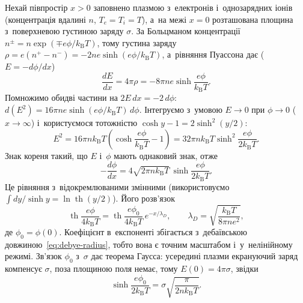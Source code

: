Нехай півпростір $x>0$ заповнено плазмою з~електронів і~однозарядних іонів (концентрація
вдалині $n$, $T_e=T_i=T$), а~на межі $x=0$ розташована площина з~поверхневою густиною
заряду $\sigma$. За Больцманом концентрації $n^{\pm}=n\exp(\mp e\phi/k_{\mathrm B}T)$,
тому густина заряду $\rho=e(n^+-n^-)=-2ne\sinh(e\phi/k_{\mathrm B}T)$, а~рівняння
Пуассона дає ($E=-d\phi/dx$)
\begin{equation*}
	\frac{dE}{dx}=4\pi\rho=-8\pi ne\sinh\frac{e\phi}{k_{\mathrm B}T}.
\end{equation*}
Помножимо обидві частини на $2E\,dx=-2\,d\phi$: $d(E^2)=16\pi
	ne\sinh(e\phi/k_{\mathrm B}T)\,d\phi$. Інтегруємо з~умовою $E\to0$ при $\phi\to0$
($x\to\infty$) і~користуємося тотожністю $\cosh y-1=2\sinh^2(y/2)$:
\begin{equation*}
	E^2=16\pi nk_{\mathrm B}T\left(\cosh\frac{e\phi}{k_{\mathrm B}T}-1\right)=32\pi nk_{\mathrm B}T\sinh^2\frac{e\phi}{2k_{\mathrm B}T}.
\end{equation*}
Знак кореня такий, що $E$ і~$\phi$ мають однаковий знак, отже
\begin{equation*}
	-\frac{d\phi}{dx}=4\sqrt{2\pi nk_{\mathrm B}T}\,\sinh\frac{e\phi}{2k_{\mathrm B}T}.
\end{equation*}
Це рівняння з~відокремлюваними змінними (використовуємо $\int dy/\sinh
	y=\ln\operatorname{th}(y/2)$). Його розв'язок
\begin{equation}\label{eq:gouy-chapman}
	\operatorname{th}\frac{e\phi}{4k_{\mathrm B}T}=\operatorname{th}\frac{e\phi_0}{4k_{\mathrm B}T}\,e^{-x/\lambda_D},\qquad
	\lambda_D=\sqrt{\frac{k_{\mathrm B}T}{8\pi ne^2}},
\end{equation}
де $\phi_0=\phi(0)$. Коефіцієнт в~експоненті збігається з~дебаївською
довжиною~\eqref{eq:debye-radius}, тобто вона є точним масштабом і~у~нелінійному режимі.
Зв'язок $\phi_0$ з~$\sigma$ дає теорема Гаусса: усередині плазми екрануючий заряд
компенсує $\sigma$, поза площиною поля немає, тому $E(0)=4\pi\sigma$, звідки
\begin{equation*}
	\sinh\frac{e\phi_0}{2k_{\mathrm B}T}=\sigma\sqrt{\frac{\pi}{2nk_{\mathrm B}T}}.
\end{equation*}
